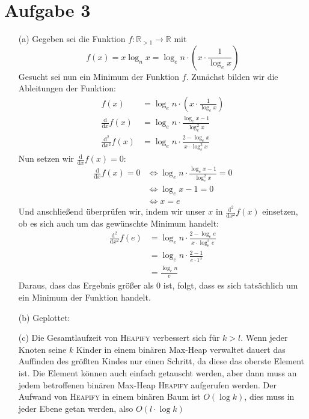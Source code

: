 \documentclass{scrartcl}
\begin{document}
\section{Aufgabe 3}
\begin{enumerate}
\item[(a)]
Gegeben sei die Funktion $f : \mathbb{R}_{>1} \to \mathbb{R}$ mit
\[
    f(x) = x \log_n x = \log_e n \cdot \left( x \cdot \frac{1}{\log_e x} \right)
\]
Gesucht sei nun ein Minimum der Funktion $f$. Zunächst bilden wir die
Ableitungen der Funktion:
\begin{align*}
f(x) &= \log_e n \cdot \left( x \cdot \frac{1}{\log_e x} \right) \\
\frac{\mathrm d}{\mathrm d x} f(x) &= \log_e n \cdot \frac{\log_e x - 1}{\log_e^2 x} \\
\frac{\mathrm d^2}{\mathrm d x^2} f(x) &= \log_e n \cdot \frac{2 - \log_e x}{x \cdot \log_e^3 x}
\end{align*}
Nun setzen wir $\frac{\mathrm d}{\mathrm d x} f(x) = 0$:
\begin{align*}
\frac{\mathrm d}{\mathrm d x} f(x) = 0 
    &\Leftrightarrow \log_e n \cdot \frac{\log_e x - 1}{\log_e^2 x} = 0 \\
    &\Leftrightarrow \log_e x - 1 = 0 \\
    &\Leftrightarrow x = e
\end{align*}
Und anschließend überprüfen wir, indem wir unser $x$ in $\frac{\mathrm
d^2}{\mathrm d x^2} f(x)$ einsetzen, ob es sich auch um das gewünschte Minimum
handelt:
\begin{align*}
\frac{\mathrm d^2}{\mathrm d x^2} f(e) &= \log_e n \cdot \frac{2 - \log_e e}{x
\cdot \log_e^3 e} \\
&= \log_e n \cdot \frac{2 - 1}{e \cdot 1^3} \\
&= \frac{\log_e n}{e}
\end{align*}
Daraus, dass das Ergebnis größer als 0 ist, folgt, dass es sich tatsächlich um
ein Minimum der Funktion handelt.

\item[(b)] Geplottet: \\

\item[(c)]
Die Gesamtlaufzeit von \textsc{Heapify} verbessert sich für $k>l$. 
Wenn jeder Knoten seine $k$ Kinder in einem binären Max-Heap verwaltet 
dauert das Auffinden des größten Kindes nur einen Schritt, da diese das 
oberste Element ist. Die Element können auch einfach getauscht werden, 
aber dann muss an jedem betroffenen binären Max-Heap \textsc{Heapify}
aufgerufen werden. Der Aufwand von \textsc{Heapify} in einem binären 
Baum ist $O(\log k)$, dies muss in jeder Ebene getan werden, also 
$O(l \cdot \log k)$ 
  

\end{enumerate}
\end{document}
